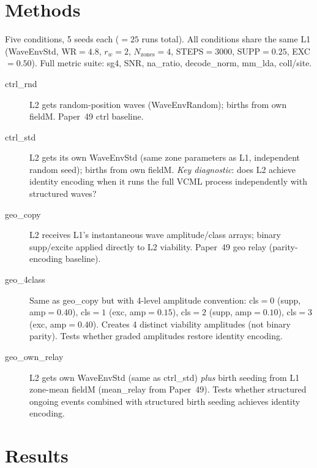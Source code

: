 \documentclass[11pt,a4paper]{article}
\begin{document}
\section{Methods}

Five conditions, 5 seeds each ($= 25$ runs total).
All conditions share the same L1 (WaveEnvStd, WR$=4.8$, $r_w=2$, $N_\mathrm{zones}=4$,
STEPS$=3000$, SUPP$=0.25$, EXC$=0.50$).
Full metric suite: sg4, SNR, na\_ratio, decode\_norm, mm\_lda, coll/site.

\begin{description}
  \item[ctrl\_rnd] L2 gets random-position waves (WaveEnvRandom); births from own fieldM.
    Paper~49 ctrl baseline.
  \item[ctrl\_std] L2 gets its own WaveEnvStd (same zone parameters as L1, independent
    random seed); births from own fieldM.
    \emph{Key diagnostic}: does L2 achieve identity encoding when it runs the full
    VCML process independently with structured waves?
  \item[geo\_copy] L2 receives L1's instantaneous wave amplitude/class arrays; binary
    supp/excite applied directly to L2 viability.
    Paper~49 geo relay (parity-encoding baseline).
  \item[geo\_4class] Same as geo\_copy but with 4-level amplitude convention:
    cls$=0$ (supp, amp$=0.40$), cls$=1$ (exc, amp$=0.15$),
    cls$=2$ (supp, amp$=0.10$), cls$=3$ (exc, amp$=0.40$).
    Creates 4 distinct viability amplitudes (not binary parity).
    Tests whether graded amplitudes restore identity encoding.
  \item[geo\_own\_relay] L2 gets own WaveEnvStd (same as ctrl\_std) \emph{plus}
    birth seeding from L1 zone-mean fieldM (mean\_relay from Paper~49).
    Tests whether structured ongoing events combined with structured birth seeding
    achieves identity encoding.
\end{description}

\section{Results}
\end{document}
